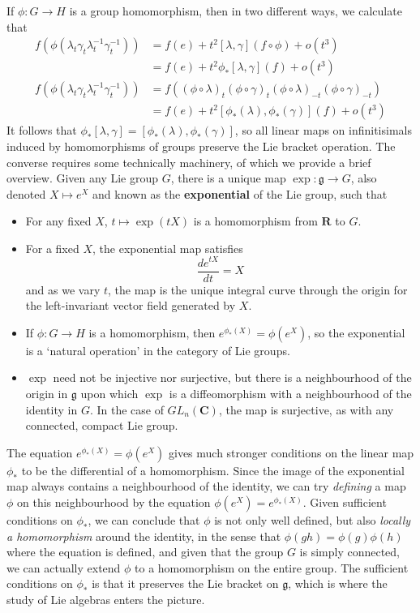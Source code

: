 If $\phi: G \to H$ is a group homomorphism, then in two different ways, we calculate that
%
\begin{align*}
     f(\phi(\lambda_t \gamma_t \lambda^{-1}_t \gamma^{-1}_t)) &= f(e) + t^2[\lambda, \gamma](f \circ \phi) + o(t^3)\\
     &= f(e) + t^2  \phi_*[\lambda, \gamma] (f) + o(t^3)\\
    f(\phi(\lambda_t \gamma_t \lambda^{-1}_t \gamma^{-1}_t)) &= f((\phi \circ \lambda)_t (\phi \circ \gamma)_t (\phi \circ \lambda)_{-t} (\phi \circ \gamma)_{-t})\\
     &= f(e) + t^2 [\phi_*(\lambda), \phi_*(\gamma)](f) + o(t^3)
\end{align*}
%
It follows that $\phi_*[\lambda, \gamma] = [\phi_*(\lambda), \phi_*(\gamma)]$, so all linear maps on infinitisimals induced by homomorphisms of groups preserve the Lie bracket operation. The converse requires some technically machinery, of which we provide a brief overview. Given any Lie group $G$, there is a unique map $\exp: \mathfrak{g} \to G$, also denoted $X \mapsto e^X$ and known as the {\bf exponential} of the Lie group, such that
%
\begin{itemize}
    \item For any fixed $X$, $t \mapsto \exp(tX)$ is a homomorphism from $\mathbf{R}$ to $G$.
    \item For a fixed $X$, the exponential map satisfies
    \[ \frac{de^{tX}}{dt} = X \]
    and as we vary $t$, the map is the unique integral curve through the origin for the left-invariant vector field generated by $X$.
    \item If $\phi: G \to H$ is a homomorphism, then $e^{\phi_*(X)} = \phi(e^X)$, so the exponential is a `natural operation' in the category of Lie groups.
    \item $\exp$ need not be injective nor surjective, but there is a neighbourhood of the origin in $\mathfrak{g}$ upon which $\exp$ is a diffeomorphism with a neighbourhood of the identity in $G$. In the case of $GL_n(\mathbf{C})$, the map is surjective, as with any connected, compact Lie group.
\end{itemize}
%
The equation $e^{\phi_*(X)} = \phi(e^X)$ gives much stronger conditions on the linear map $\phi_*$ to be the differential of a homomorphism. Since the image of the exponential map always contains a neighbourhood of the identity, we can try {\it defining} a map $\phi$ on this neighbourhood by the equation $\phi(e^X) = e^{\phi_*(X)}$. Given sufficient conditions on $\phi_*$, we can conclude that $\phi$ is not only well defined, but also {\it locally a homomorphism} around the identity, in the sense that $\phi(gh) = \phi(g) \phi(h)$ where the equation is defined, and given that the group $G$ is simply connected, we can actually extend $\phi$ to a homomorphism on the entire group. The sufficient conditions on $\phi_*$ is that it preserves the Lie bracket on $\mathfrak{g}$, which is where the study of Lie algebras enters the picture.

